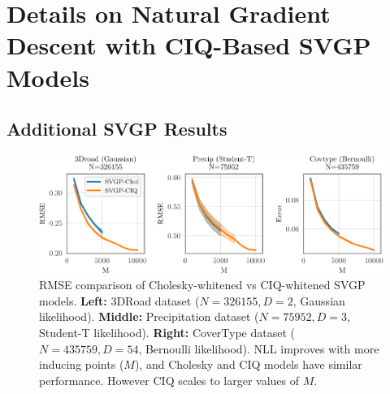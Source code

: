 \chapter{Details on Natural Gradient Descent with CIQ-Based SVGP Models}

\section{Additional SVGP Results}

\begin{figure}[ht!]
  \centering
  \includegraphics[width=\linewidth]{figures/variational_error.pdf}
  \caption[RMSE comparison of Cholesky-whitened vs CIQ-whitened SVGP models.]{
    RMSE comparison of Cholesky-whitened vs CIQ-whitened SVGP models.
    {\bf Left:} 3DRoad dataset ($N=326155, D=2$, Gaussian likelihood).
    {\bf Middle:} Precipitation dataset ($N=75952, D=3$, Student-T likelihood).
    {\bf Right:} CoverType dataset ($N=435759, D=54$, Bernoulli likelihood).
    NLL improves with more inducing points ($M$), and Cholesky and CIQ models have similar performance.
    However CIQ scales to larger values of $M$.
  }
  \label{fig:variational_error}
\end{figure}
